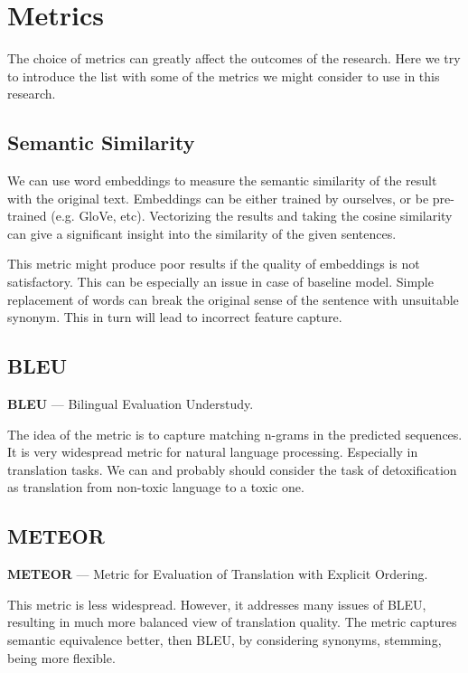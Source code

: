 \section{Metrics}

The choice of metrics can greatly affect the outcomes of the research. Here we
try to introduce the list with some of the metrics we might consider to use in
this research.

\subsection{Semantic Similarity}

We can use word embeddings to measure the semantic similarity of the result
with the original text. Embeddings can be either trained by ourselves, or be
pre-trained (e.g. GloVe, etc). Vectorizing the results and taking the cosine
similarity can give a significant insight into the similarity of the given
sentences.

This metric might produce poor results if the quality of embeddings is not
satisfactory. This can be especially an issue in case of baseline model. Simple
replacement of words can break the original sense of the sentence with
unsuitable synonym. This in turn will lead to incorrect feature capture.

\subsection{BLEU}

\textbf{BLEU} --- Bilingual Evaluation Understudy.

The idea of the metric is to capture matching n-grams in the predicted
sequences. It is very widespread metric for natural language processing.
Especially in translation tasks. We can and probably should consider the task
of detoxification as translation from non-toxic language to a toxic one.

\subsection{METEOR}

\textbf{METEOR} --- Metric for Evaluation of Translation with Explicit Ordering.

This metric is less widespread. However, it addresses many issues of BLEU,
resulting in much more balanced view of translation quality. The metric
captures semantic equivalence better, then BLEU, by considering synonyms,
stemming, being more flexible.

